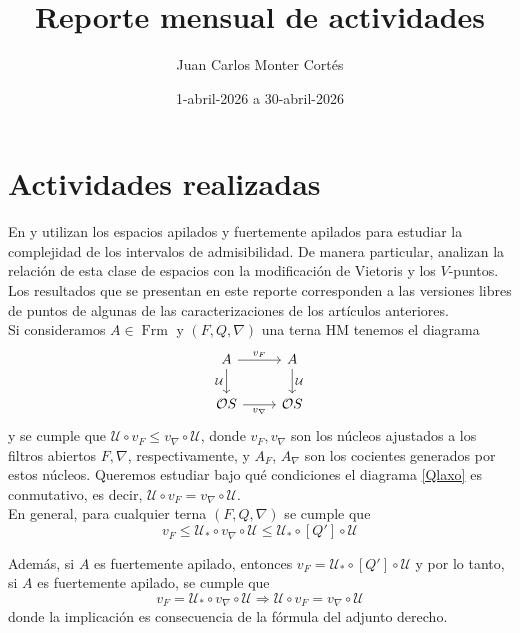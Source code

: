 \documentclass[12pt]{article}
\title{Reporte mensual de actividades}
\date{1-abril-2026 a 30-abril-2026}
\author{Juan Carlos Monter Cortés}
\DeclareMathOperator{\Frm}{Frm}
\begin{document}
\maketitle

\section{Actividades realizadas}
En \cite{simmons2004vietoris} y \cite{sexton2006ordinal} utilizan los espacios apilados y fuertemente apilados para estudiar la complejidad de los intervalos de admisibilidad. 
De manera particular, analizan la relación de esta clase de espacios con la modificación de Vietoris y los $V$-puntos. Los resultados que se presentan en este reporte
corresponden a las versiones libres de puntos de algunas de las caracterizaciones de los artículos anteriores.\\

Si consideramos $A\in \Frm$ y $(F, Q, \nabla)$ una terna HM tenemos el diagrama
\begin{equation}\label{Qlaxo}
\begin{tikzcd}
	A & A \\
	{\mathcal{O}S} & {\mathcal{O}S}
	\arrow["{v_F}", from=1-1, to=1-2]
	\arrow["{\mathcal{U}}"', from=1-1, to=2-1]
	\arrow["{\mathcal{U}}", from=1-2, to=2-2]
	\arrow["{v_\nabla}"', from=2-1, to=2-2]
\end{tikzcd}
\end{equation}
y se cumple que $\mathcal{U}\circ v_F\leq v_\nabla \circ \mathcal{U}$, donde $v_F, v_\nabla$ son los núcleos ajustados a los filtros abiertos 
$F, \nabla$, respectivamente, y $A_F$, $A_\nabla$ son los cocientes generados por estos núcleos. Queremos estudiar bajo qué condiciones el 
diagrama \eqref{Qlaxo} es conmutativo, es decir, $\mathcal{U}\circ v_F=v_\nabla \circ \mathcal{U}$.\\

En general, para cualquier terna $(F, Q, \nabla)$ se cumple que
\[
v_F\leq \mathcal{U}_*\circ v_\nabla\circ \mathcal{U}\leq \mathcal{U}_*\circ [Q']\circ\mathcal{U}
\]

Además, si $A$ es fuertemente apilado, entonces $v_F=\mathcal{U}_*\circ [Q']\circ \mathcal{U}$ y por lo tanto, si $A$ es fuertemente apilado, se cumple que 
\[
v_F=\mathcal{U}_*\circ v_\nabla\circ \mathcal{U}\Rightarrow \mathcal{U}\circ v_F=v_\nabla\circ \mathcal{U}
\]
donde la implicación es consecuencia de la fórmula del adjunto derecho.\\
\end{document}
